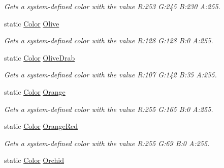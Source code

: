 \begin{DoxyCompactItemize}
\begin{DoxyCompactList}\small\item\em Gets a system-\/defined color with the value R\+:253 G\+:245 B\+:230 A\+:255.\end{DoxyCompactList}\item 
static \hyperlink{structMicrosoft_1_1Xna_1_1Framework_1_1Color}{Color} \hyperlink{structMicrosoft_1_1Xna_1_1Framework_1_1Color_a20fa8b0eab53cc7fb93ec30c019624fe}{Olive}
\begin{DoxyCompactList}\small\item\em Gets a system-\/defined color with the value R\+:128 G\+:128 B\+:0 A\+:255.\end{DoxyCompactList}\item 
static \hyperlink{structMicrosoft_1_1Xna_1_1Framework_1_1Color}{Color} \hyperlink{structMicrosoft_1_1Xna_1_1Framework_1_1Color_af809aa015c1b6e2e4715aece8b00f532}{Olive\+Drab}
\begin{DoxyCompactList}\small\item\em Gets a system-\/defined color with the value R\+:107 G\+:142 B\+:35 A\+:255.\end{DoxyCompactList}\item 
static \hyperlink{structMicrosoft_1_1Xna_1_1Framework_1_1Color}{Color} \hyperlink{structMicrosoft_1_1Xna_1_1Framework_1_1Color_ad18a56cc64968052ba629f56402ea94e}{Orange}
\begin{DoxyCompactList}\small\item\em Gets a system-\/defined color with the value R\+:255 G\+:165 B\+:0 A\+:255.\end{DoxyCompactList}\item 
static \hyperlink{structMicrosoft_1_1Xna_1_1Framework_1_1Color}{Color} \hyperlink{structMicrosoft_1_1Xna_1_1Framework_1_1Color_a1c07e6afd0554a2aab685a1643af7993}{Orange\+Red}
\begin{DoxyCompactList}\small\item\em Gets a system-\/defined color with the value R\+:255 G\+:69 B\+:0 A\+:255.\end{DoxyCompactList}\item 
static \hyperlink{structMicrosoft_1_1Xna_1_1Framework_1_1Color}{Color} \hyperlink{structMicrosoft_1_1Xna_1_1Framework_1_1Color_aaf94327edc65148eeedf66f3ac0945f4}{Orchid}

\end{DoxyCompactItemize}
